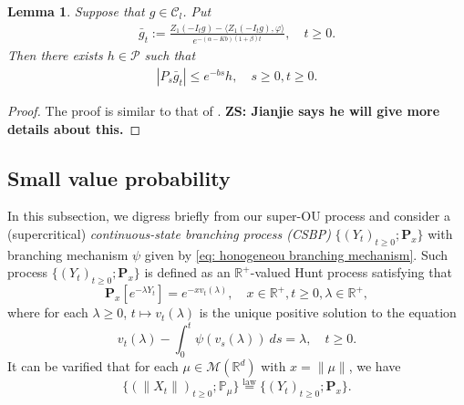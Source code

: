 \documentclass[12pt,a4paper]{amsart}
\theoremstyle{plain}
\newtheorem{lem}[thm]{Lemma}
\theoremstyle{definition}
\numberwithin{equation}{section}
\begin{document}
\begin{lem}\label{control of gn} Suppose that $g\in \mathcal{C}_l$.
    Put
\begin{align}
    \bar{g}_t
    :=\frac{Z_1(-I_tg)-\langle Z_1(-I_tg),\varphi\rangle}{e^{-(\alpha-Kb)(1+\beta)t}},\quad t\geq 0.
\end{align}
    Then there exists $h\in \mathcal{P}$ such that
\begin{align}
    |P_s\bar{g}_t|
    \leq e^{-bs}h,\quad s\geq 0, t\geq 0.
\end{align}
\end{lem}
\begin{proof}
    The proof  is similar to that of \cite[Lemma 2.8]{MarksMilos2018CLT}.
    {\bf ZS: Jianjie says he will give more details about this.}
\end{proof}


\subsection{Small value probability}
    In this subsection, we digress briefly from our super-OU process and consider a (supercritical) \emph{continuous-state branching process (CSBP)} $\{(Y_t)_{t\geq 0}; \mathbf P_x\}$ with branching mechanism $\psi$ given by \eqref{eq: honogeneou branching mechanism}.
    Such process $\{(Y_t)_{t\geq 0}; \mathbf P_x\}$ is defined as an $\mathbb R^+$-valued Hunt process satisfying that
\[
    \mathbf P_x[e^{-\lambda Y_t}] = e^{- x v_t(\lambda)},
    \quad x\in \mathbb R^+, t\geq 0, \lambda \in \mathbb R^+,
\] 
    where for each $\lambda\geq 0$, $t\mapsto v_t(\lambda)$ is the unique positive solution to the equation
\begin{equation}
\label{eq: fkpp equation for CSBP}
    v_t(\lambda) - \int_0^t \psi(v_s(\lambda))~ds = \lambda,
    \quad t\geq 0.
\end{equation}
    It can be varified that for each $\mu \in \mathcal M(\mathbb R^d)$ with $x = \| \mu \|$, we have
\[
    \{(\|X_t\|)_{t\geq 0}; \mathbb P_\mu\} 
    \overset{\text{law}}{=} \{(Y_t)_{t\geq 0}; \mathbf P_x\}.
\]
    
\end{document}
